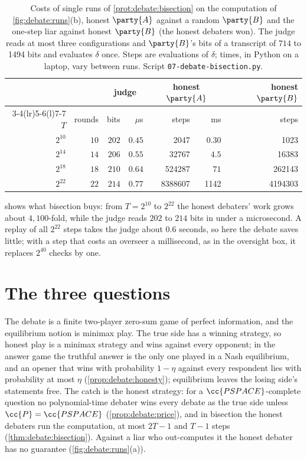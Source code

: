 \begin{refsection}
\begin{table}[t]
\centering\small
\begin{tabular}{@{}r r r r r r r@{}}
\toprule
& & \multicolumn{2}{c}{judge} & \multicolumn{2}{c}{honest $\party{A}$} & honest $\party{B}$\\
\cmidrule(lr){3-4}\cmidrule(lr){5-6}\cmidrule(l){7-7}
$T$ & rounds & bits & $\mu$s & steps & ms & steps\\
\midrule
$2^{10}$ & $10$ & $202$ & $0.45$ & \num{2047} & $0.30$ & \num{1023}\\
$2^{14}$ & $14$ & $206$ & $0.55$ & \num{32767} & $4.5$ & \num{16383}\\
$2^{18}$ & $18$ & $210$ & $0.64$ & \num{524287} & $71$ & \num{262143}\\
$2^{22}$ & $22$ & $214$ & $0.77$ & \num{8388607} & \num{1142} & \num{4194303}\\
\bottomrule
\end{tabular}
\caption{Costs of single runs of \cref{prot:debate:bisection} on the computation of \cref{fig:debate:runs}(b), honest $\party{A}$ against a random $\party{B}$ and the one-step liar against honest $\party{B}$ (the honest debaters won). The judge reads at most three configurations and $\party{B}$'s bits of a transcript of $714$ to \num{1494} bits and evaluates $\delta$ once. Steps are evaluations of $\delta$; times, in Python on a laptop, vary between runs. Script \texttt{07-debate-bisection.py}.}\label{tab:debate:costs}
\end{table}

 shows what bisection buys: from $T=2^{10}$ to $2^{22}$ the honest debaters' work grows about $4{,}100$-fold, while the judge reads $202$ to $214$ bits in under a microsecond. A replay of all $2^{22}$ steps takes the judge about $0.6$ seconds, so here the debate saves little; with a step that costs an overseer a millisecond, as in the oversight box, it replaces $2^{40}$ checks by one.

\section{The three questions}\label{sec:debate:questions}

\questionone The debate is a finite two-player zero-sum game of perfect information, and the equilibrium notion is minimax play. The true side has a winning strategy, so honest play is a minimax strategy and wins against every opponent; in the answer game the truthful answer is the only one played in a Nash equilibrium, and an opener that wins with probability $1-\eta$ against every respondent lies with probability at most $\eta$ (\cref{prop:debate:honesty}); equilibrium leaves the losing side's statements free. The catch is the honest strategy: for a $\cc{PSPACE}$-complete question no polynomial-time debater wins every debate as the true side unless $\cc{P}=\cc{PSPACE}$ (\cref{prop:debate:price}), and in bisection the honest debaters run the computation, at most $2T-1$ and $T-1$ steps (\cref{thm:debate:bisection}). Against a liar who out-computes it the honest debater has no guarantee (\cref{fig:debate:runs}(a)).


\end{refsection}
